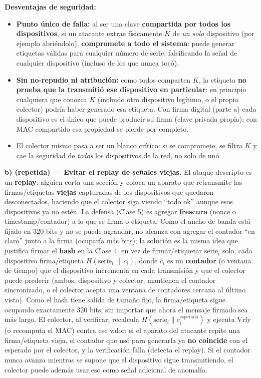 \textbf{Desventajas de seguridad:}
\begin{itemize}
  \item \textbf{Punto único de falla:} al ser una clave \textbf{compartida por todos los
  dispositivos}, si un atacante extrae físicamente $K$ de \emph{un solo} dispositivo (por
  ejemplo abriéndolo), \textbf{compromete a todo el sistema}: puede generar etiquetas
  válidas para cualquier número de serie, falsificando la señal de cualquier dispositivo
  (incluso de los que nunca tocó).
  \item \textbf{Sin no-repudio ni atribución:} como todos comparten $K$, la etiqueta
  \textbf{no prueba que la transmitió ese dispositivo en particular}: en principio
  cualquiera que conozca $K$ (incluido otro dispositivo legítimo, o el propio colector)
  podría haber generado esa etiqueta. Con firma digital (parte a) cada dispositivo es el
  único que puede producir su firma (clave privada propia); con MAC compartido esa
  propiedad se pierde por completo.
  \item El colector mismo pasa a ser un blanco crítico: si se compromete, se filtra $K$ y
  cae la seguridad de \emph{todos} los dispositivos de la red, no solo de uno.
\end{itemize}

\textbf{b) (repetida) --- Evitar el replay de señales viejas.} El ataque descripto es un
\textbf{replay}: alguien corta una sección y coloca un aparato que retransmite las
firmas/etiquetas \textbf{viejas} capturadas de los dispositivos que quedaron desconectados,
haciendo que el colector siga viendo ``todo ok'' aunque esos dispositivos ya no estén. La
defensa (Clase 5) es agregar \textbf{frescura} (nonce o timestamp/contador) a lo que se
firma o etiqueta. Como el ancho de banda está fijado en 320 bits y no se puede agrandar, no
alcanza con agregar el contador ``en claro'' junto a la firma (ocuparía más bits); la
solución es la misma idea que justifica firmar el \textbf{hash} en la Clase 4: en vez de
firmar/etiquetar $\text{serie}_i$ solo, cada dispositivo firma/etiqueta
$H(\text{serie}_i\,\|\,c_i)$, donde $c_i$ es un \textbf{contador} (o ventana de tiempo)
que el dispositivo incrementa en cada transmisión y que el colector puede predecir
(ambos, dispositivo y colector, mantienen el contador sincronizado, o el colector acepta
una ventana de contadores cercana al último visto). Como el hash tiene salida de tamaño
fijo, la firma/etiqueta sigue ocupando exactamente 320 bits, sin importar que ahora el
mensaje firmado sea más largo. El colector, al verificar, recalcula
$H(\text{serie}_i\|c_i^{\text{esperado}})$ y ejecuta $\mathrm{Vrfy}$ (o recomputa el MAC)
contra ese valor; si el aparato del atacante repite una firma/etiqueta vieja, el contador
que usó para generarla ya \textbf{no coincide} con el esperado por el colector, y la
verificación falla (detecta el replay). Si el contador nunca avanza mientras se supone que
el dispositivo sigue transmitiendo, el colector puede además usar eso como señal adicional
de anomalía.

